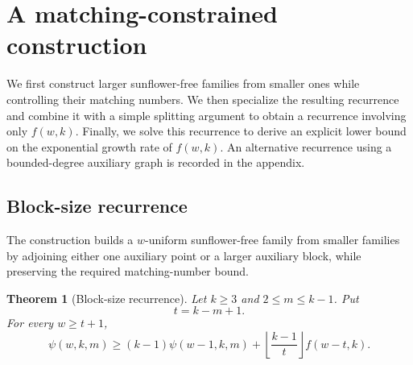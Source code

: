 \documentclass[11pt]{article}
\numberwithin{equation}{section}
\newtheorem{theorem}{Theorem}[section]
\theoremstyle{definition}
\theoremstyle{remark}
\begin{document}
\section{A matching-constrained construction}
\label{sec:constructions}

We first construct larger sunflower-free families from smaller ones while
controlling their matching numbers. We then specialize the resulting
recurrence and combine it with a simple splitting argument to obtain a
recurrence involving only $f(w,k)$. Finally, we solve this recurrence to
derive an explicit lower bound on the exponential growth rate of $f(w,k)$.
An alternative recurrence using a bounded-degree auxiliary graph is recorded
in the appendix.

\subsection{Block-size recurrence}

The construction builds a $w$-uniform sunflower-free family from
smaller families by adjoining either one auxiliary point or a larger
auxiliary block, while preserving the required matching-number bound.

\begin{theorem}[Block-size recurrence]
\label{thm:block-size}
Let $k\ge3$ and $2\le m\le k-1$. Put
\[
 t=k-m+1.
\]
For every $w\ge t+1$,
\begin{equation}
 \psi(w,k,m)
 \ge (k-1)\psi(w-1,k,m)
    +\left\lfloor\frac{k-1}{t}\right\rfloor f(w-t,k).
 \label{eq:block-size}
\end{equation}
\end{theorem}
\end{document}
